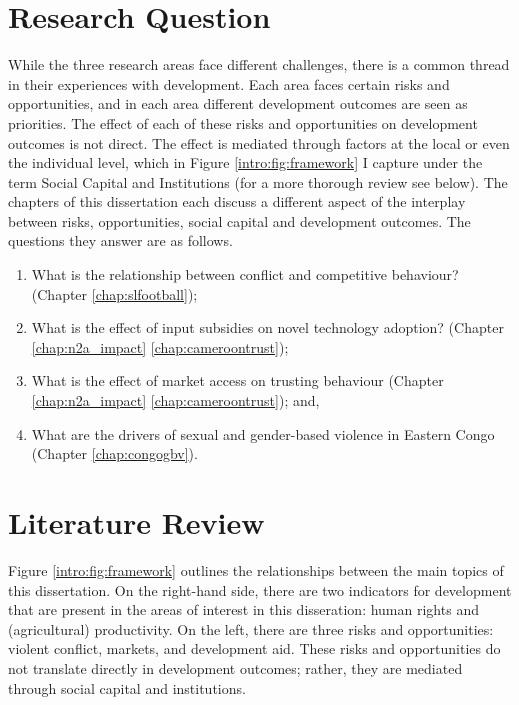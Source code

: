 
\section{Research Question}
While the three research areas face different challenges, there is a common thread in their experiences with development. Each area faces certain risks and opportunities, and in each area different development outcomes are seen as priorities. The effect of each of these risks and opportunities on development outcomes is not direct. The effect is mediated through factors at the local or even the individual level, which in Figure \ref{intro:fig:framework} I capture under the term Social Capital and Institutions (for a more thorough review see below).  The chapters of this dissertation each discuss a different aspect of the interplay between risks, opportunities, social capital and development outcomes. The questions they answer are as follows.
\begin{enumerate}
	\item What is the relationship between conflict and competitive behaviour? (Chapter \ref{chap:slfootball});
	\item What is the effect of input subsidies on novel technology adoption? (Chapter \ref{chap:n2a_impact}
\ref{chap:cameroontrust});
	\item What is the effect of market access on trusting behaviour (Chapter \ref{chap:n2a_impact}
\ref{chap:cameroontrust}); and,
	\item What are the drivers of sexual and gender-based violence in Eastern Congo (Chapter \ref{chap:congogbv}).
\end{enumerate}


\section{Literature Review}
Figure \ref{intro:fig:framework} outlines the relationships between the main topics of this dissertation. On the right-hand side, there are two indicators for development that are present in the areas of interest in this disseration: human rights and (agricultural) productivity. On the left, there are three risks and opportunities: violent conflict, markets, and development aid. These risks and opportunities do not translate directly in development outcomes; rather, they are mediated through social capital and institutions.


